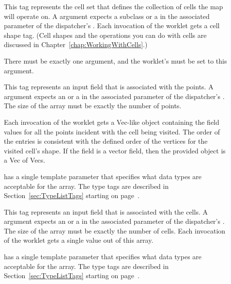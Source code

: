 \begin{description}
\item[] This tag represents the cell set that defines
  the collection of cells the map will operate on. A 
  argument expects a  subclass or a
   in the associated parameter of the
  dispatcher's . Each invocation of the worklet gets a
  cell shape tag. (Cell shapes and the operations you can do with cells are
  discussed in Chapter~\ref{chap:WorkingWithCells}.)

  There must be exactly one  argument, and the worklet's
   must be set to this argument.

\item[] This tag represents an input field that is
  associated with the points. A  argument expects an
   or a  in
  the associated parameter of the dispatcher's . The size
  of the array must be exactly the number of points.

  Each invocation of the worklet gets a Vec-like object containing the
  field values for all the points incident with the cell being visited. The
  order of the entries is consistent with the defined order of the vertices
  for the visited cell's shape. If the field is a vector field, then the
  provided object is a Vec of Vecs.

   has a single template parameter that specifies what
  data types are acceptable for the array. The type tags are described in
  Section~\ref{sec:TypeListTags} starting on page~\pageref{TypeTagList}.

\item[] This tag represents an input field that is
  associated with the cells. A  argument expects an
   or a  in
  the associated parameter of the dispatcher's . The size
  of the array must be exactly the number of cells. Each invocation of the
  worklet gets a single value out of this array.

   has a single template parameter that specifies what
  data types are acceptable for the array. The type tags are described in
  Section~\ref{sec:TypeListTags} starting on page~\pageref{TypeTagList}.


\end{description}
